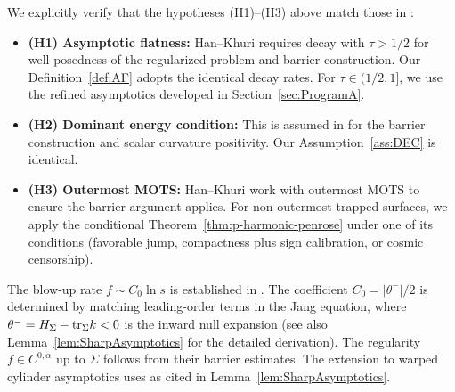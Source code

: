 \begin{theorem}
\begin{remark}\label{rem:HanKhuriVerification}
We explicitly verify that the hypotheses (H1)--(H3) above match those in \cite{hankhuri2013}:
\begin{itemize}
    \item \textbf{(H1) Asymptotic flatness:} Han--Khuri \cite[Definition 2.1]{hankhuri2013} requires decay with $\tau > 1/2$ for well-posedness of the regularized problem and barrier construction. Our Definition~\ref{def:AF} adopts the identical decay rates. For $\tau \in (1/2, 1]$, we use the refined asymptotics developed in Section~\ref{sec:ProgramA}.
    \item \textbf{(H2) Dominant energy condition:} This is assumed in \cite[Theorem 3.2]{hankhuri2013} for the barrier construction and scalar curvature positivity. Our Assumption~\ref{ass:DEC} is identical.
    \item \textbf{(H3) Outermost MOTS:} Han--Khuri work with outermost MOTS to ensure the barrier argument applies. For non-outermost trapped surfaces, we apply the conditional Theorem~\ref{thm:p-harmonic-penrose} under one of its conditions (favorable jump, compactness plus sign calibration, or cosmic censorship).
\end{itemize}
The blow-up rate $f \sim C_0 \ln s$ is established in \cite[Proposition 4.5]{hankhuri2013}. The coefficient $C_0 = |\theta^-|/2$ is determined by matching leading-order terms in the Jang equation, where $\theta^- = H_\Sigma - \mathrm{tr}_\Sigma k < 0$ is the inward null expansion (see also Lemma~\ref{lem:SharpAsymptotics} for the detailed derivation). The regularity $f \in C^{0,\alpha}$ up to $\Sigma$ follows from their barrier estimates. The extension to warped cylinder asymptotics uses \cite{chakhuri2023} as cited in Lemma~\ref{lem:SharpAsymptotics}.
\end{remark}


\end{theorem}

